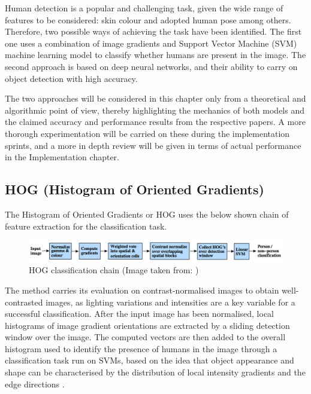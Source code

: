 Human detection is a popular and challenging task, given the wide range of features to be considered: skin colour and adopted human pose among others. Therefore, two possible ways of achieving the task have been identified. The first one uses a combination of image gradients and Support Vector Machine (SVM) machine learning model to classify whether humans are present in the image. The second approach is based on deep neural networks, and their ability to carry on object detection with high accuracy.

The two approaches will be considered in this chapter only from a theoretical and algorithmic point of view, thereby highlighting the mechanics of both models and the claimed accuracy and performance results from the respective papers. A more thorough experimentation will be carried on these during the implementation sprints, and a more in depth review will be given in terms of actual performance in the Implementation chapter.

\subsection{HOG (Histogram of Oriented Gradients)}

The Histogram of Oriented Gradients or HOG uses the below shown chain of feature extraction for the classification task.

\begin{figure}[!htbp]
\begin{center}
\includegraphics[width=\linewidth]{images/hog_chain.png}
\end{center}
\caption{HOG classification chain (Image taken from: \cite{paper:dalal2005histograms})}
\label{fig:hog_chain}
\end{figure}

The method carries its evaluation on contrast-normalised images to obtain well-contrasted images, as lighting variations and intensities are a key variable for a successful classification. After the input image has been normalised, local histograms of image gradient orientations are extracted by a sliding detection window over the image. The computed vectors are then added to the overall histogram used to identify the presence of humans in the image through a classification task run on SVMs, based on the idea that object appearance and shape can be characterised by the distribution of local intensity gradients and the edge directions \cite{paper:dalal2005histograms}.

